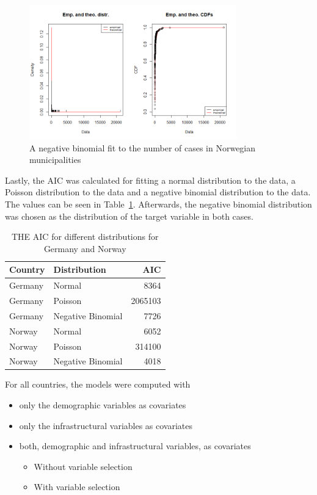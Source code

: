 %     
\begin{figure}[H]
    \centering
    \includegraphics[width = 0.8\textwidth]{neg_binom_norge.png}
    \caption{A negative binomial fit to the number of cases in Norwegian municipalities}
    \label{nb_norge}
\end{figure}
Lastly, the AIC was calculated for fitting a normal distribution to the data, a Poisson distribution to the data and a negative binomial distribution to the data. The values can be seen in Table~\ref{aic}. Afterwards, the negative binomial distribution was chosen as the distribution of the target variable in both cases. \\
\begin{table}[H] 
\caption{THE AIC for different distributions for Germany and Norway \label{aic}}
\begin{tabular}{l l r}
\toprule
\textbf{Country}	& \textbf{Distribution}	& \textbf{AIC} \\
\midrule
Germany & Normal & 8364 \\
Germany & Poisson & 2065103 \\
Germany & Negative Binomial & 7726 \\
Norway & Normal & 6052 \\
Norway & Poisson & 314100 \\
Norway & Negative Binomial & 4018 \\
\bottomrule
\end{tabular}
\end{table}
For all countries, the models were computed with
\begin{itemize}
    \item[1.] only the demographic variables as covariates
    \item[2.] only the infrastructural variables as covariates
    \item[3.] both, demographic and infrastructural variables, as covariates
    \begin{itemize}
        \item[3.1] Without variable selection
        \item[3.2] With variable selection
    \end{itemize}
\end{itemize}

